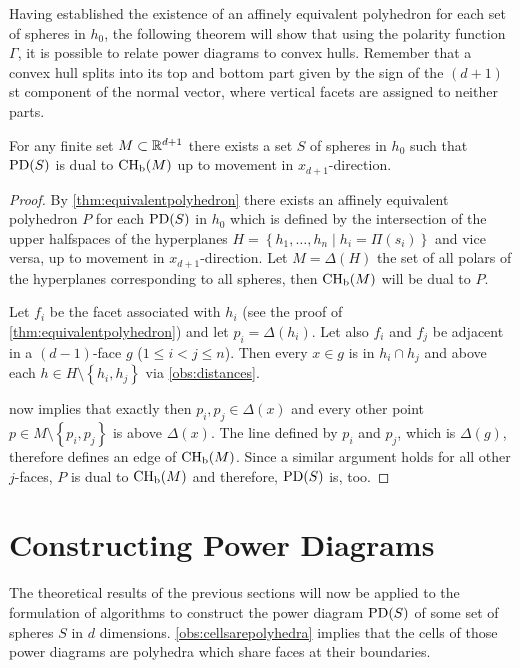 Having established the existence of an affinely equivalent polyhedron for each set of spheres in $h_0$, the following theorem will show that using the polarity function $\Gamma$, it is possible to relate power diagrams to convex hulls.
Remember that a convex hull splits into its top and bottom part given by the sign of the $(d+1)$st component of the normal vector, where vertical facets are assigned to neither parts.
\begin{theorem}
    \label{thm:equivalentconvexhull}
    For any finite set $M \subset \mathbb{R}^{d+1}$ there exists a set $S$ of spheres in $h_0$ such that $\operatorname{PD}(S)$ is dual to $\operatorname{CH_b}(M)$ up to movement in $x_{d+1}$-direction.
\end{theorem}
\begin{proof}
    By \cref{thm:equivalentpolyhedron} there exists an affinely equivalent polyhedron $P$ for each $\operatorname{PD}(S)$ in $h_0$ which is defined by the intersection of the upper halfspaces of the hyperplanes $H = \left\{ h_1, \dots, h_n \mid h_i = \Pi(s_i) \right\}$ and vice versa, up to movement in $x_{d+1}$-direction.
    Let $M = \Delta(H)$ the set of all polars of the hyperplanes corresponding to all spheres, then $\operatorname{CH_b}(M)$ will be dual to $P$.

    Let $f_i$ be the facet associated with $h_i$ (see the proof of \cref{thm:equivalentpolyhedron}) and let $p_i = \Delta(h_i)$.
    Let also $f_i$ and $f_j$ be adjacent in a $(d-1)$-face $g$ ($1 \leq i < j \leq n$).
    Then every $x \in g$ is in $h_i \cap h_j$ and above each $h \in H \setminus \left\{ h_i, h_j \right\}$ via \cref{obs:distances}.

     now implies that exactly then $p_i, p_j \in \Delta(x)$ and every other point $p \in M \setminus \left\{ p_i, p_j \right\}$ is above $\Delta(x)$.
    The line defined by $p_i$ and $p_j$, which is $\Delta(g)$, therefore defines an edge of $\operatorname{CH_b}(M)$.
    Since a similar argument holds for all other $j$-faces, $P$ is dual to $\operatorname{CH_b}(M)$ and therefore, $\operatorname{PD}(S)$ is, too.
\end{proof}

\section{Constructing Power Diagrams}
\label{sec:constructing_power_diagrams}
The theoretical results of the previous sections will now be applied to the formulation of algorithms to construct the power diagram $\operatorname{PD}(S)$ of some set of spheres $S$ in $d$ dimensions.
\cref{obs:cellsarepolyhedra} implies that the cells of those power diagrams are polyhedra which share faces at their boundaries.

